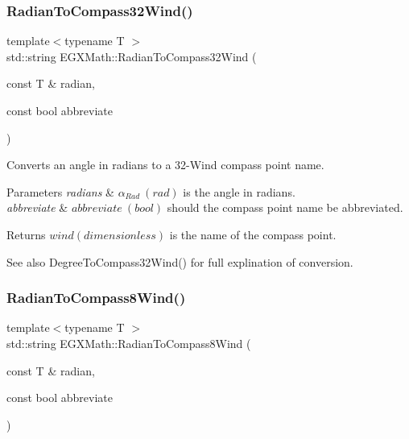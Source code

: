 \subsubsection{\texorpdfstring{Radian\+To\+Compass32\+Wind()}{RadianToCompass32Wind()}}
{\footnotesize\ttfamily template$<$typename T $>$ \\
std\+::string E\+G\+X\+Math\+::\+Radian\+To\+Compass32\+Wind (\begin{DoxyParamCaption}\item[{const T \&}]{radian,  }\item[{const bool}]{abbreviate }\end{DoxyParamCaption})}



Converts an angle in radians to a 32-\/\+Wind compass point name. 


\begin{DoxyParams}{Parameters}
{\em radians} & $\alpha_{Rad}\ (rad)$ is the angle in radians. \\
\hline
{\em abbreviate} & $abbreviate\ (bool)$ should the compass point name be abbreviated. \\
\hline
\end{DoxyParams}
\begin{DoxyReturn}{Returns}
$wind (dimensionless)$ is the name of the compass point. 
\end{DoxyReturn}
\begin{DoxySeeAlso}{See also}
Degree\+To\+Compass32\+Wind() for full explination of conversion. 
\end{DoxySeeAlso}
\mbox{\label{group___angle_conversions_ga3c06a01860f69bcd57fab918037318b3}} 
\subsubsection{\texorpdfstring{Radian\+To\+Compass8\+Wind()}{RadianToCompass8Wind()}}
{\footnotesize\ttfamily template$<$typename T $>$ \\
std\+::string E\+G\+X\+Math\+::\+Radian\+To\+Compass8\+Wind (\begin{DoxyParamCaption}\item[{const T \&}]{radian,  }\item[{const bool}]{abbreviate }\end{DoxyParamCaption})}



